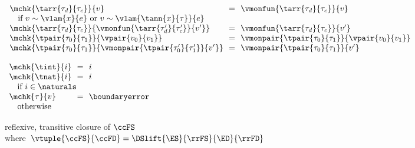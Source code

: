 \begin{flushleft}
\smallskip
{}
\begin{minipage}[t]{\columnwidth}
{$\begin{array}{l@{~~}c@{~~}l}
  \mchk{\tarr{\tau_d}{\tau_c}}{v} & = & \vmonfun{\tarr{\tau_d}{\tau_c}}{v}
\\ \multicolumn{3}{l}{\mbox{\quad if $v \sim \vlam{x}{e}$ or $v \sim \vlam{\tann{x}{\tau}}{e}$}}
\\
  \mchk{\tarr{\tau_d}{\tau_c}}{\vmonfun{\tarr{\tau_d'}{\tau_c'}}{v'}} & = & \vmonfun{\tarr{\tau_d}{\tau_c}}{v'}
\\
  \mchk{\tpair{\tau_0}{\tau_1}}{\vpair{v_0}{v_1}} & = & \vmonpair{\tpair{\tau_0}{\tau_1}}{\vpair{v_0}{v_1}}
\\
  \mchk{\tpair{\tau_0}{\tau_1}}{\vmonpair{\tpair{\tau_0'}{\tau_1'}}{v'}} & = & \vmonpair{\tpair{\tau_0}{\tau_1}}{v'}
\end{array}$
}
\end{minipage}\hspace{\columnsep}%
\begin{minipage}[t]{\columnwidth}
$\begin{array}{l@{~~}c@{~~}l}
  \mchk{\tint}{i} & = & i
\\
  \mchk{\tnat}{i} & = & i
\\ \multicolumn{3}{l}{\mbox{\quad if $i \in \naturals$}}
\\
  \mchk{\tau}{v} & = & \boundaryerror
\\ \multicolumn{3}{l}{\mbox{\quad otherwise}}
\end{array}$
\end{minipage}

\smallskip
{} reflexive, transitive closure of $\ccFS$\\
\mbox{\quad where $\vtuple{\ccFS}{\ccFD} = \DSlift{\ES}{\rrFS}{\ED}{\rrFD}$}
\end{flushleft}
